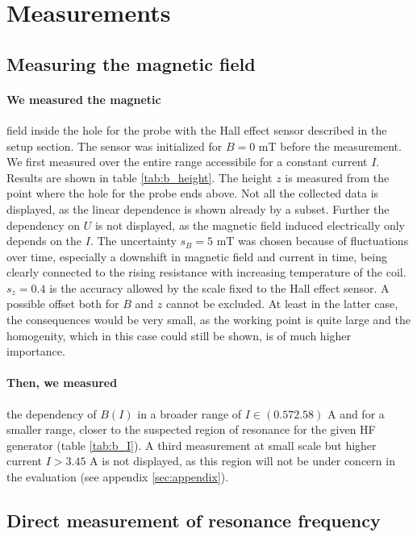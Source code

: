 \section{Measurements}

\subsection{Measuring the magnetic field}
\paragraph{We measured the magnetic} 
field inside the hole for the probe with the Hall effect sensor described in the setup section. 
The sensor was initialized for $B = 0$ mT before the measurement. We first measured over the 
entire range accessibile for a constant current $I$. Results are shown in table \ref{tab:b_height}. 
The height $z$ is measured from the point where the hole for the probe ends above. 
Not all the collected data is displayed, as the linear dependence is shown already by a subset. Further 
the dependency on $U$ is not displayed, as the magnetic field induced electrically only depends on the 
$I$. The uncertainty $s_B = 5$ mT was chosen because of fluctuations over time, especially a 
downshift in magnetic field and current in time, being clearly connected to the rising resistance with 
increasing temperature of the coil. $s_z = 0.4$ is the accuracy allowed by the scale fixed to the 
Hall effect sensor. A possible offset both for $B$ and $z$ cannot be excluded. At least in the latter case, 
the consequences would be very small, as the working point is quite large and the homogenity, which 
in this case could still be shown, is of much higher importance. 

 
\paragraph{Then, we measured} 
the dependency of $B(I)$ in a broader range of $I \in (0.57 2.58)$ A 
and for a smaller range, closer to the suspected region of resonance 
for the given HF generator (table \ref{tab:b_I}). A third measurement at small scale 
but higher current $I > 3.45$ A is not displayed, as this region will not be under 
concern in the evaluation (see appendix \ref{sec:appendix}). 

\FloatBarrier

\subsection{Direct measurement of resonance frequency}
